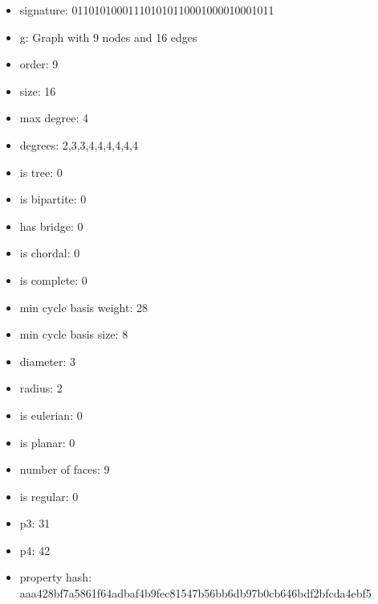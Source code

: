 \newpage
\begin{figure}
\end{figure}
\begin{itemize}
\item signature: 011010100011101010110001000010001011
\item g: Graph with 9 nodes and 16 edges
\item order: 9
\item size: 16
\item max degree: 4
\item degrees: 2,3,3,4,4,4,4,4,4
\item is tree: 0
\item is bipartite: 0
\item has bridge: 0
\item is chordal: 0
\item is complete: 0
\item min cycle basis weight: 28
\item min cycle basis size: 8
\item diameter: 3
\item radius: 2
\item is eulerian: 0
\item is planar: 0
\item number of faces: 9
\item is regular: 0
\item p3: 31
\item p4: 42
\item property hash: aaa428bf7a5861f64adbaf4b9fec81547b56bb6db97b0cb646bdf2bfcda4ebf5
\end{itemize}
